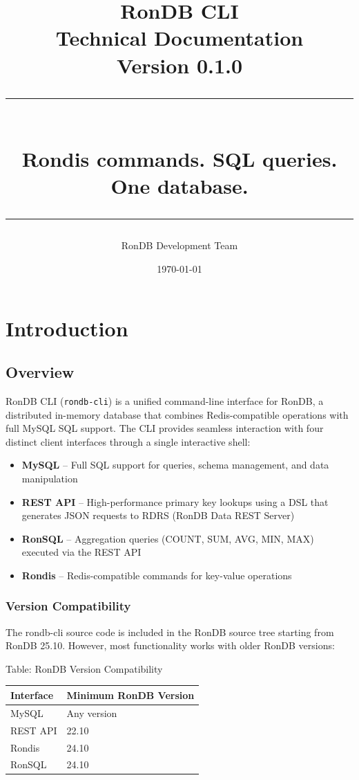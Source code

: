 \documentclass[11pt,a4paper]{report}
\title{
    \vspace{2cm}
    {\Huge\bfseries\color{rondb-orange} RonDB CLI}\\[0.5cm]
    {\Large Technical Documentation}\\[1cm]
    {\large Version 0.1.0}\\[2cm]
    \rule{\textwidth}{1pt}\\[0.5cm]
    {\large Rondis commands. SQL queries. One database.}\\
    \rule{\textwidth}{1pt}
}
\author{RonDB Development Team}
\date{\today}
\begin{document}
\maketitle
\thispagestyle{empty}

\tableofcontents
\newpage

\chapter{Introduction}

\section{Overview}

RonDB CLI (\texttt{rondb-cli}) is a unified command-line interface for RonDB, a distributed in-memory database that combines Redis-compatible operations with full MySQL SQL support. The CLI provides seamless interaction with four distinct client interfaces through a single interactive shell:

\begin{itemize}
    \item \textbf{MySQL} -- Full SQL support for queries, schema management, and data manipulation
    \item \textbf{REST API} -- High-performance primary key lookups using a DSL that generates JSON requests to RDRS (RonDB Data REST Server)
    \item \textbf{RonSQL} -- Aggregation queries (COUNT, SUM, AVG, MIN, MAX) executed via the REST API
    \item \textbf{Rondis} -- Redis-compatible commands for key-value operations
\end{itemize}

\subsection{Version Compatibility}

The rondb-cli source code is included in the RonDB source tree starting from RonDB 25.10. However, most functionality works with older RonDB versions:

Table: RonDB Version Compatibility

\begin{tabular}{ll}
\toprule
Interface & Minimum RonDB Version \\
\midrule
MySQL & Any version \\
REST API & 22.10 \\
Rondis & 24.10 \\
RonSQL & 24.10 \\
\bottomrule
\end{tabular}
\end{document}
